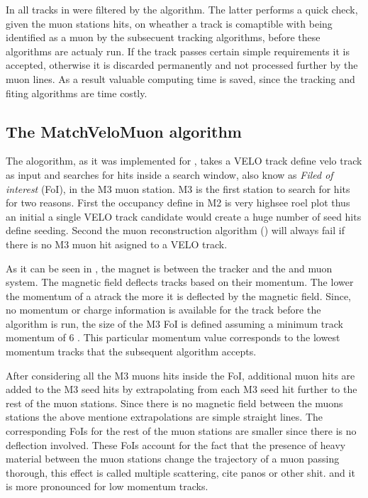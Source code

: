 In \runone all \velo tracks in \hltone were filtered by the \mvm algorithm. The latter performs a quick check,
given the muon stations hits, on wheather a \velo track is comaptible with being identified as a muon by the subsecuent
tracking algorithms, before these algorithms are actualy run. If the \velo track passes certain simple requirements it
is accepted, otherwise it is discarded permanently and not processed further by the \hlt muon lines. As a result
valuable computing time is saved, since the \FwD tracking and fiting algorithms are time costly.

\subsection{The MatchVeloMuon algorithm}
\label{sec:muon_matching}

The \mvm alogorithm, as it was implemented for \runone \cite{roelThesis}, takes a VELO track{\color{red} define velo track} as input
and searches for hits inside a search window, also know as {\it Filed of interest} (FoI), in the M3 muon station.
M3 is the first station to search for hits for two reasons. First the occupancy{\color{red} define} in M2 is very high{\color{red}see roel plot}
thus an initial a single VELO track candidate would create
a huge number of seed hits{\color{red} define seeding}. Second the muon reconstruction algorithm (\isMuon) will always fail if
there is no M3 muon hit asigned to a VELO track.

As it can be seen in \figref{}, the \lhcb magnet is between the \velo tracker and the and muon system.
The \lhcb magnetic field deflects tracks based on their momentum. The lower the momentum of a atrack the more
it is deflected by the magnetic field. Since, no momentum or charge information is available for the \velo
track before the \FwD algorithm is run, the size of the M3 FoI is defined assuming a minimum track momentum of 6 \gevc.
This particular momentum value corresponds to the lowest momentum tracks that the subsequent \isMuon algorithm accepts.

After considering all the M3 muons hits inside the FoI, additional muon hits are added to
the M3 seed hits by extrapolating from each M3 seed hit further to the rest of the muon stations.
Since there is no magnetic field between the muons stations the above mentione extrapolations are simple straight lines.
The corresponding FoIs for the rest of the muon stations are smaller since there is no deflection involved.
These FoIs account for the fact that the presence of heavy material between the muon stations change the
trajectory of a muon passing thorough, this effect is called multiple scattering, {\color{red} cite panos or other shit.}
and it is more pronounced for low momentum tracks.

